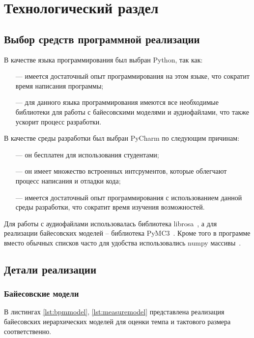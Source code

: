 \section{Технологический раздел}
\setcounter{figure}{0}
\setcounter{table}{0}

\subsection{Выбор средств программной реализации}

В качестве языка программирования был выбран Python, так как:

\begin{itemize}
	\item[---] имеется достаточный опыт программирования на этом языке, что сократит время написания программы;
	\item[---] для данного языка программирования имеются все необходимые библиотеки для работы с байесовскими моделями и аудиофайлами, что также ускорит процесс разработки.
\end{itemize}

В качестве среды разработки был выбран PyCharm по следующим причинам:

\begin{itemize}
	\item[---] он бесплатен для использования студентами;
	\item[---] он имеет множество встроенных интсрументов, которые облегчают процесс написания и отладки кода;
	\item[---] имеется достаточный опыт программирования с использованием данной среды разработки, что сократит время изучения возможностей.
\end{itemize}

Для работы с аудиофайлами использовалась библиотека librosa~\cite{librosa}, а для реализации байесовских моделей -- библиотека PyMC3~\cite{pymc3_docs}. Кроме того в программе вместо обычных списков часто для удобства использовались numpy массивы~\cite{numpy}.

\subsection{Детали реализации}

\subsubsection{Байесовские модели}

В листингах \ref{lst:bpmmodel}, \ref{lst:measuremodel} представлена реализация байесовских иерархических моделей для оценки темпа и тактового размера соответственно.

